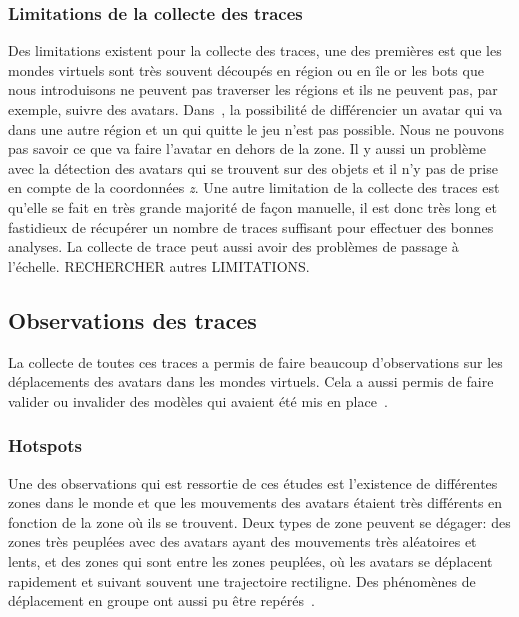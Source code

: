  		\subsubsection{Limitations de la collecte des traces}
	Des limitations existent pour la collecte des traces, une des premières est que les mondes virtuels sont très souvent découpés en région ou en île or les bots que nous introduisons ne peuvent pas traverser les régions et ils ne peuvent pas, par exemple, suivre des avatars. Dans~\cite{DBLP:journals/corr/abs-0807-2328}, la possibilité de différencier un avatar qui va dans une autre région et un qui quitte le jeu n'est pas possible. Nous ne pouvons pas savoir ce que va faire l'avatar en dehors de la zone. Il y aussi un problème avec la détection des avatars qui se trouvent sur des objets et il n'y pas de prise en compte de la coordonnées \textit{z}. Une autre limitation de la collecte des traces est qu'elle se fait en très grande majorité de façon manuelle, il est donc très long et fastidieux de récupérer un nombre de traces suffisant pour effectuer des bonnes analyses. La collecte de trace peut aussi avoir des problèmes de passage à l'échelle. RECHERCHER autres LIMITATIONS.

	\subsection{Observations des traces}
	 La collecte de toutes ces traces a permis de faire beaucoup d'observations sur les déplacements des avatars dans les mondes virtuels. Cela a aussi permis de faire valider ou invalider des modèles qui avaient été mis en place~\cite{DBLP:journals/corr/abs-0807-2328}. 
		\subsubsection{Hotspots}
	Une des observations qui est ressortie de ces études est l'existence de différentes zones dans le monde et que les mouvements des avatars étaient très différents en fonction de la zone où ils se trouvent. Deux types de zone peuvent se dégager: des zones très peuplées avec des avatars ayant des mouvements très aléatoires et lents, et des zones qui sont entre les zones peuplées, où les avatars se déplacent rapidement et suivant souvent une trajectoire rectiligne. Des phénomènes de déplacement en groupe ont aussi pu être repérés~\cite{15141312}. \\
